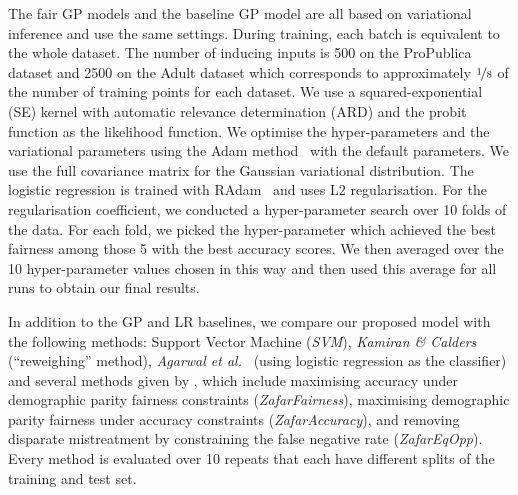The fair GP models and the baseline GP model are all based on variational inference and use the same settings.
During training, each batch is equivalent to the whole dataset.
The number of inducing inputs is 500 on the ProPublica dataset
and 2500 on the Adult dataset
which corresponds to approximately $\nicefrac{1}{8}$ of the number of training points for each dataset.
We use a squared-exponential (SE) kernel with automatic relevance determination (ARD)
and the probit function as the likelihood function.
We optimise the hyper-parameters and the variational parameters
using the Adam method~\citep{kingma2014adam} with the default parameters. %
We use the full covariance matrix for the Gaussian variational distribution.
%
The logistic regression is trained with RAdam~\citep{liu2019variance} and uses L2 regularisation.
For the regularisation coefficient, we conducted a hyper-parameter search over 10 folds of the data.
For each fold, we picked the hyper-parameter which achieved the best fairness among those 5 with
the best accuracy scores.
We then averaged over the 10 hyper-parameter values chosen in this way and then used this average for all runs to obtain our final results.

In addition to the GP and LR baselines, we compare our proposed model with the following methods:
Support Vector Machine (\emph{SVM}), \emph{Kamiran \& Calders}~\citep{kamiran2012data} (``reweighing'' method),
\emph{Agarwal et al.}~\citep{AgaBeyDudLanetal18} (using logistic regression as the classifier)
and several methods given by \citet{zafar2017fairnessconstraints,zafar2017fairnesstreatment},
which include maximising accuracy under demographic parity fairness constraints (\emph{ZafarFairness}),
maximising demographic parity fairness under accuracy constraints (\emph{ZafarAccuracy}),
and removing disparate mistreatment by constraining the false negative rate (\emph{ZafarEqOpp}).
Every method is evaluated over 10 repeats that each have different splits of the training and test set.

